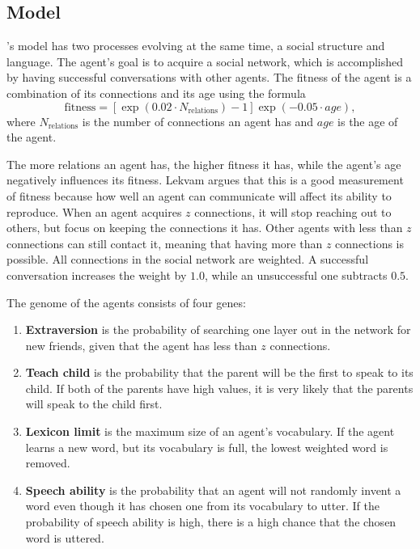 \subsection{Model} 
\citeauthor{lekvam2014co}'s model has two processes evolving at the same time, a social structure and language. The agent's goal is to acquire a social network, which is accomplished by having successful conversations with other agents. The fitness of the agent is a combination of its connections and its age using the formula
\begin{equation}
    \mathrm{fitness} = [\exp(0.02 \cdot N_\mathrm{relations}) - 1] \exp(-0.05 \cdot \mathrm{\textit{age}}),
\end{equation}
where $N_\mathrm{relations}$ is the number of connections an agent has and $\mathrm{\textit{age}}$ is the age of the agent.

The more relations an agent has, the higher fitness it has, while the agent's age negatively influences its fitness. Lekvam argues that this is a good measurement of fitness because how well an agent can communicate will affect its ability to reproduce. When an agent acquires $z$ connections, it will stop reaching out to others, but focus on keeping the connections it has. Other agents with less than $z$ connections can still contact it, meaning that having more than $z$ connections is possible. All connections in the social network are weighted. A successful conversation increases the weight by $1.0$, while an unsuccessful one subtracts $0.5$. 

The genome of the agents consists of four genes:
\begin{enumerate}
    \item \textbf{Extraversion} is the probability of searching one layer out in the network for new friends, given that the agent has less than $z$ connections.
    
    \item \textbf{Teach child} is the probability that the parent will be the first to speak to its child. If both of the parents have high values, it is very likely that the parents will speak to the child first.
    
    \item \textbf{Lexicon limit} is the maximum size of an agent's vocabulary. If the agent learns a new word, but its vocabulary is full, the lowest weighted word is removed.
    
    \item \textbf{Speech ability} is the probability that an agent will not randomly invent a word even though it has chosen one from its vocabulary to utter. If the probability of speech ability is high, there is a high chance that the chosen word is uttered.
\end{enumerate}

